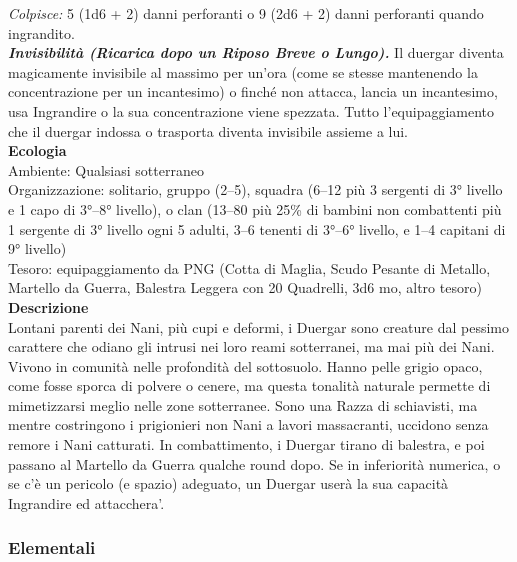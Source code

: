 \begin{multicols}{2}
\emph{Colpisce:} 5 (1d6 + 2) danni perforanti o 9 (2d6 + 2) danni perforanti quando ingrandito.\\
\emph{\textbf{Invisibilità (Ricarica dopo un Riposo Breve o Lungo).}} Il duergar diventa magicamente invisibile al massimo per un'ora (come se stesse mantenendo la concentrazione per un incantesimo) o finché non attacca, lancia un incantesimo, usa Ingrandire o la sua concentrazione viene spezzata. Tutto l'equipaggiamento che il duergar indossa o trasporta diventa invisibile assieme a lui.\\
\textbf{Ecologia}\\
Ambiente: Qualsiasi sotterraneo\\
Organizzazione: solitario, gruppo (2–5), squadra (6–12 più 3 sergenti di 3° livello e 1 capo di 3°–8° livello), o clan (13–80 più 25\% di bambini non combattenti più 1 sergente di 3° livello ogni 5 adulti, 3–6 tenenti di 3°–6° livello, e 1–4 capitani di 9° livello)\\
Tesoro: equipaggiamento da PNG (Cotta di Maglia, Scudo Pesante di Metallo, Martello da Guerra, Balestra Leggera con 20 Quadrelli, 3d6 mo, altro tesoro)\\
\textbf{Descrizione}\\
Lontani parenti dei Nani, più cupi e deformi, i Duergar sono creature dal pessimo carattere che odiano gli intrusi nei loro reami sotterranei, ma mai più dei Nani. Vivono in comunità nelle profondità del sottosuolo. Hanno pelle grigio opaco, come fosse sporca di polvere o cenere, ma questa tonalità naturale permette di mimetizzarsi meglio nelle zone sotterranee. Sono una Razza di schiavisti, ma mentre costringono i prigionieri non Nani a lavori massacranti, uccidono senza remore i Nani catturati. In combattimento, i Duergar tirano di balestra, e poi passano al Martello da Guerra qualche round dopo. Se in inferiorità numerica, o se c’è un pericolo (e spazio) adeguato, un Duergar userà la sua capacità Ingrandire ed attacchera'.


\subsubsection{Elementali}


\end{multicols}
